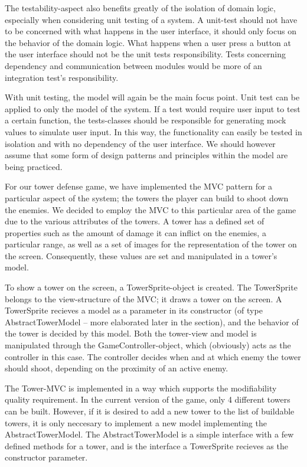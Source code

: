 The testability-aspect also benefits greatly of the isolation of domain logic, especially when considering unit testing of a system. A unit-test should not have to be concerned with what happens in the user interface, it should only focus on the behavior of the domain logic. What happens when a user press a button at the user interface should not be the unit tests responsibility. Tests concerning dependency and communication between modules would be more of an integration test's responsibility. 


With unit testing, the model will again be the main focus point. Unit test can be applied to only the model of the system. If a test would require user input to test a certain function, the tests-classes should be responsible for generating mock values to simulate user input. In this way, the functionality can easily be tested in isolation and with no dependency of the user interface. We should however assume that some form of design patterns and principles within the model are being practiced.


For our tower defense game, we have implemented the MVC pattern for a particular aspect of the system; the towers the player can build to shoot down the enemies. We decided to employ the MVC to this particular area of the game due to the various attributes of the towers. A tower has a defined set of properties such as the amount of damage it can inflict on the enemies, a particular range, as well as a set of images for the representation of the tower on the screen. Consequently, these values are set and manipulated in a tower's model. 

To show a tower on the screen, a TowerSprite-object is created. The TowerSprite belongs to the view-structure of the MVC; it draws a tower on the screen. A TowerSprite recieves a model as a parameter in its constructor (of type AbstractTowerModel -- more elaborated later in the section), and the behavior of the tower is decided by this model. Both the tower-view and model is manipulated through the GameController-object, which (obviously) acts as the controller in this case. The controller decides when and at which enemy the tower should shoot, depending on the proximity of an active enemy.

The Tower-MVC is implemented in a way which supports the modifiability quality requirement. In the current version of the game, only 4 different towers can be built. However, if it is desired to add a new tower to the list of buildable towers, it is only neccesary to implement a new model implementing the AbstractTowerModel. The AbstractTowerModel is a simple interface with a few defined methods for a tower, and is the interface a TowerSprite recieves as the constructor parameter. 

